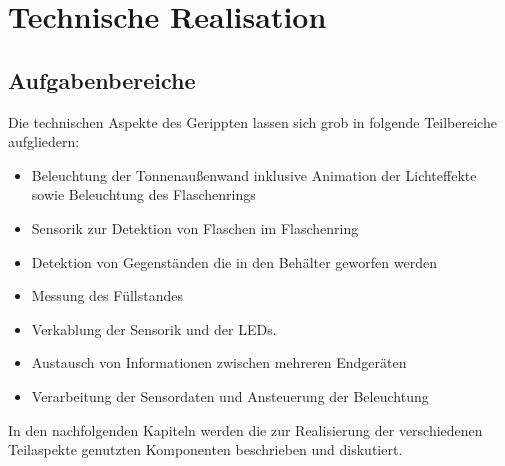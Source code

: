 \chapter{Technische Realisation}

\section{Aufgabenbereiche}












    Die technischen Aspekte des Gerippten lassen sich grob in folgende Teilbereiche aufgliedern:

    \begin{itemize}
        \item Beleuchtung der Tonnenaußenwand inklusive Animation der Lichteffekte sowie Beleuchtung des Flaschenrings
        \item Sensorik zur Detektion von Flaschen im Flaschenring
        \item Detektion von Gegenständen die in den Behälter geworfen werden
        \item Messung des Füllstandes
        \item Verkablung der Sensorik und der LEDs.
        \item Austausch von Informationen zwischen mehreren Endgeräten
        \item Verarbeitung der Sensordaten und Ansteuerung der Beleuchtung
    \end{itemize}

    In den nachfolgenden Kapiteln werden die zur Realisierung der verschiedenen Teilaspekte genutzten Komponenten beschrieben und diskutiert.



